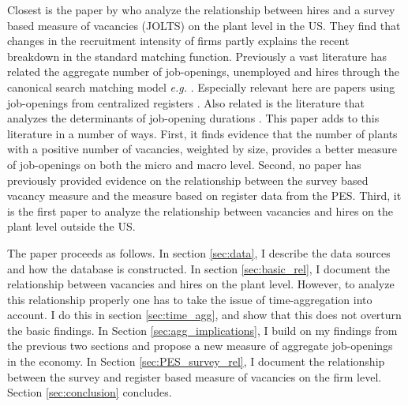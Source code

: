 Closest is the paper by \cite{Davis2013} who analyze the relationship between hires and a survey based measure of vacancies (JOLTS) on the plant level in the US. They find that changes in the recruitment intensity of firms partly explains the recent breakdown in the standard matching function. Previously a vast literature has related the aggregate number of job-openings, unemployed and hires through the canonical search matching model \emph{e.g.} \cite{Blanchard1990}. Especially relevant here are papers using job-openings from centralized registers \citep{Coles1996, Hansen2004, Yashiv2000, Sunde2007}. Also related is the literature that analyzes the determinants of job-opening durations \citep{Ours1991, Burdett1998, Barron1997, Holzer1990}. This paper adds to this literature in a number of ways. First, it finds evidence that the number of plants with a positive number of vacancies, weighted by size, provides a better measure of job-openings on both the micro and macro level. Second, no paper has previously provided evidence on the relationship between the survey based vacancy measure and the measure based on register data from the PES. Third, it is the first paper to analyze the relationship between vacancies and  hires on the plant level outside the US. 

The paper proceeds as follows. In section \ref{sec:data}, I describe the data sources and how the database is constructed. In section \ref{sec:basic_rel}, I document the relationship between vacancies and hires on the plant level. However, to analyze this relationship properly one has to take the issue of time-aggregation into account. I do this in section \ref{sec:time_agg}, and show that this does not overturn the basic findings. In Section \ref{sec:agg_implications}, I build on my findings from the previous two sections and propose a new measure of aggregate job-openings in the economy. In Section \ref{sec:PES_survey_rel}, I document the relationship between the survey and register based measure of vacancies on the firm level. Section \ref{sec:conclusion} concludes.